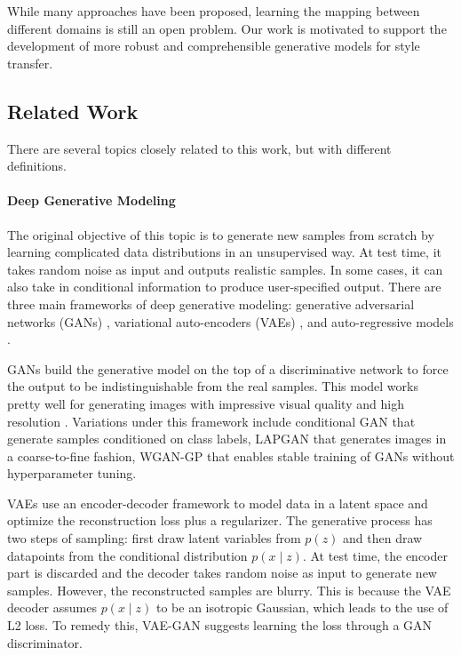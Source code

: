 \documentclass{article}
\begin{document}
While many approaches have been proposed, learning the mapping between different domains is still an open problem. Our work is motivated to support the development of more robust and comprehensible generative models for style transfer.


\subsection{Related Work}
There are several topics closely related to this work, but with different definitions.

\paragraph{Deep Generative Modeling}
The original objective of this topic is to generate new samples from scratch by learning complicated data distributions in an unsupervised way. At test time, it takes random noise as input and outputs realistic samples. In some cases, it can also take in conditional information to produce user-specified output. There are three main frameworks of deep generative modeling: generative adversarial networks (GANs) \cite{NIPS2014_5423}, variational auto-encoders (VAEs) \cite{DBLP:journals/corr/KingmaW13}, and auto-regressive models \cite{VanDenOord:2016:PRN:3045390.3045575}.

GANs build the generative model on the top of a discriminative network to force the output to be indistinguishable from the real samples. This model works pretty well for generating images with impressive visual quality \cite{DBLP:journals/corr/RadfordMC15} and high resolution \cite{DBLP:journals/corr/abs-1710-10196}. Variations under this framework include conditional GAN \cite{DBLP:journals/corr/MirzaO14} that generate samples conditioned on class labels, LAPGAN \cite{NIPS2015_5773} that generates images in a coarse-to-fine fashion, WGAN-GP \cite{NIPS2017_7159} that enables stable training of GANs without hyperparameter tuning.

VAEs use an encoder-decoder framework to model data in a latent space and optimize the reconstruction loss plus a regularizer. The generative process has two steps of sampling: first draw latent variables from $p(z)$ and then draw datapoints from the conditional distribution $p(x\mid z)$. At test time, the encoder part is discarded and the decoder takes random noise as input to generate new samples. However, the reconstructed samples are blurry. This is because the VAE decoder assumes $p(x\mid z)$ to be an isotropic Gaussian, which leads to the use of L2 loss. To remedy this, VAE-GAN \cite{Larsen:2016:ABP:3045390.3045555} suggests learning the loss through a GAN discriminator.
\end{document}

